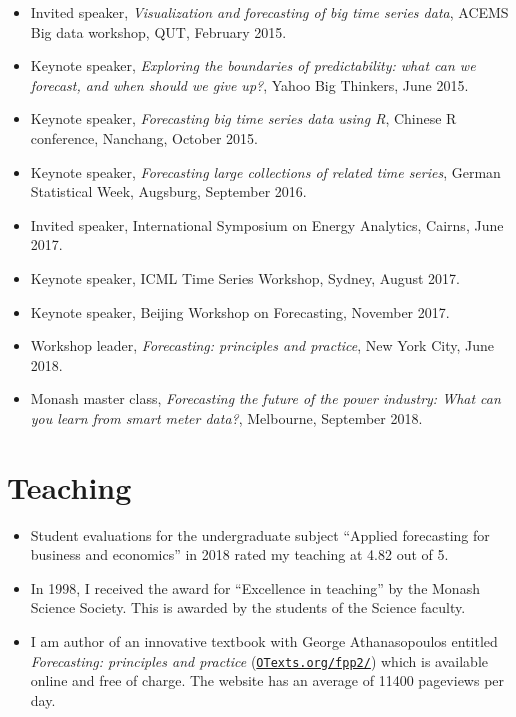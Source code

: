\documentclass[10pt,a4paper,]{article}
\providecommand{\tightlist}{%
  \setlength{\itemsep}{0pt}\setlength{\parskip}{0pt}}
\begin{document}
\begin{itemize}
\item
  Invited speaker, \emph{Visualization and forecasting of big time
  series data}, ACEMS Big data workshop, QUT, February 2015.
\item
  Keynote speaker, \emph{Exploring the boundaries of predictability:
  what can we forecast, and when should we give up?}, Yahoo Big
  Thinkers, June 2015.
\item
  Keynote speaker, \emph{Forecasting big time series data using R},
  Chinese R conference, Nanchang, October 2015.
\item
  Keynote speaker, \emph{Forecasting large collections of related time
  series}, German Statistical Week, Augsburg, September 2016.
\item
  Invited speaker, International Symposium on Energy Analytics, Cairns,
  June 2017.
\item
  Keynote speaker, ICML Time Series Workshop, Sydney, August 2017.
\item
  Keynote speaker, Beijing Workshop on Forecasting, November 2017.
\item
  Workshop leader, \emph{Forecasting: principles and practice}, New York
  City, June 2018.
\item
  Monash master class, \emph{Forecasting the future of the power
  industry: What can you learn from smart meter data?}, Melbourne,
  September 2018.
\end{itemize}

\hypertarget{teaching}{%
\section{Teaching}\label{teaching}}

\begin{itemize}
\tightlist
\item
  Student evaluations for the undergraduate subject ``Applied
  forecasting for business and economics'' in 2018 rated my teaching at
  4.82 out of 5.
\item
  In 1998, I received the award for ``Excellence in teaching'' by the
  Monash Science Society. This is awarded by the students of the Science
  faculty.
\item
  I am author of an innovative textbook with George Athanasopoulos
  entitled \emph{Forecasting: principles and practice}
  (\href{https://OTexts.org/fpp2}{\texttt{OTexts.org/fpp2/}}) which is
  available online and free of charge. The website has an average of
  11400 pageviews per day.
\end{itemize}
\end{document}
